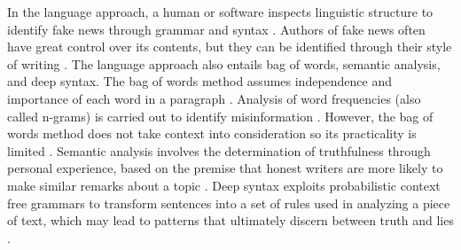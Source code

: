 In the language approach, a human or software inspects linguistic structure to identify fake news through grammar and syntax \cite{burkhardt2017history}. Authors of fake news often have great control over its contents, but they can be identified through their style of writing \cite{yang2018ti-cnn}. The language approach also entails bag of words, semantic analysis, and deep syntax. The bag of words method assumes independence and importance of each word in a paragraph \cite{burkhardt2017history}. Analysis of word frequencies (also called n-grams) is carried out to identify misinformation \cite{thota2018fake}. However, the bag of words method does not take context into consideration so its practicality is limited \cite{potthast2017stylometric}. Semantic analysis involves the determination of truthfulness through personal experience, based on the premise that honest writers are more likely to make similar remarks about a topic \cite{chen2015news}. Deep syntax exploits probabilistic context free grammars to transform sentences into a set of rules used in analyzing a piece of text, which may lead to patterns that ultimately discern between truth and lies \cite{zhou2018fake, Stahl2018FakeND}.

